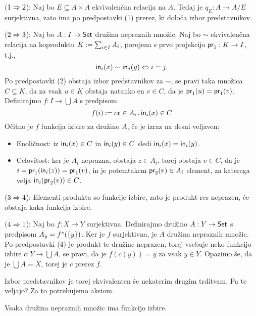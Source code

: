 \begin{dokaz}
  ($1 \lthen 2$):
  Naj bo $E \subseteq A \times A$ ekvivalenčna relacija na $A$. Tedaj je $q_E : A \to A/E$
  surjektivna, zato ima po predpostavki (1) prerez, ki določa izbor predstavnikov.

  ($2 \lthen 3$):
  Naj bo $A : I \to \Set$ družina nepraznih množic. Naj bo $\sim$ ekvivalenčna relacija
  na koproduktu $K \defeq \sum_{i \in I} A_i$, porojena s prvo projekcijo $\fst : K \to I$, t.j.,
  \begin{equation*}
    \inj[i](x) \sim \inj[j](y) \liff i = j.
  \end{equation*}
  Po predpostavki (2) obstaja izbor predstavnikov za $\sim$, se pravi taka množica $C \subseteq K$, da
  za vsak $u \in K$ obstaja natanko en $v \in C$, da je $\fst(u) = \fst(v)$. Definirajmo $f : I \to
  \bigcup A$ s predpisom
  \begin{equation*}
    f(i) \defeq \descr{x \in A_i} \inj[i](x) \in C
  \end{equation*}
  Očitno je $f$ funkcija izbire za družino $A$, če je izraz na desni veljaven:
  \begin{itemize}
  \item Enoličnost: iz $\inj[i](x) \in C$ in $\inj[i](y) \in C$ sledi $\inj[i](x) = \inj[i](y)$.
  \item Celovitost: ker je $A_i$ neprazna, obstaja $z \in A_i$, torej obstaja $v \in C$, da je
    $i = \fst(\inj[i](z)) = \fst(v)$, in je potemtakem $\snd(v) \in A_i$ element, za katerega velja
    $\inj[i](\snd(v)) \in C$.
  \end{itemize}

  ($3 \lthen 4$):
  Elementi produkta so funkcije izbire, zato je produkt res neprazen, če obstaja
  kaka funkcija izbire.

  ($4 \lthen 1$):
  Naj bo $f : X \to Y$ surjektivna. Definirajmo družino $A : Y \to \Set$ s
  predpisom $A_y = \invimg{f}(\set{y})$. Ker je $f$ surjektivna, je $A$ družina nepraznih
  množic. Po predpostavki (4) je produkt te družine neprazen, torej vsebuje neko
  funkcijo izbire $c : Y \to \bigcup A$, se pravi, da je $f(c(y)) = y$ za vsak $y \in Y$.
  Opazimo še, da je $\bigcup A = X$, torej je $c$ prerez $f$.
\end{dokaz}

Izbor predstavnikov je torej ekvivalenten še nekaterim drugim trditvam. Pa te veljajo? Za
to potrebujemo aksiom.

\begin{aksiom}
  Vsaka družina nepraznih množic ima funkcijo izbire.
\end{aksiom}

